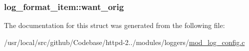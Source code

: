\subsubsection[{\texorpdfstring{want\+\_\+orig}{want_orig}}]{ log\+\_\+format\+\_\+item\+::want\+\_\+orig}\hypertarget{structlog__format__item_ad47dec8a92bdf2e45b6ee306caf5a34a}{}\label{structlog__format__item_ad47dec8a92bdf2e45b6ee306caf5a34a}


The documentation for this struct was generated from the following file\+:\begin{DoxyCompactItemize}
\item 
/usr/local/src/github/\+Codebase/httpd-\/2../modules/loggers/\hyperlink{mod__log__config_8c}{mod\+\_\+log\+\_\+config.\+c}\end{DoxyCompactItemize}
